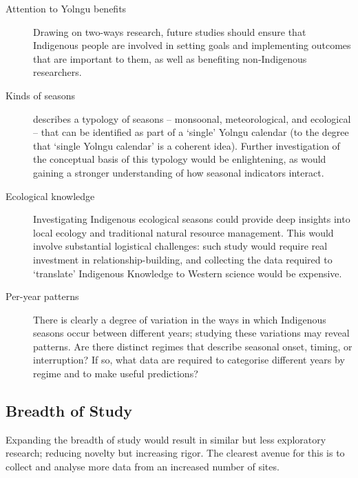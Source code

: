 \begin{description}
\item[Attention to Yolngu benefits]
    Drawing on two-ways research, future studies should ensure that Indigenous
    people are involved in setting goals and implementing outcomes that are
    important to them, as well as benefiting non-Indigenous researchers.

\item[Kinds of seasons]
     describes a typology of seasons -- monsoonal,
    meteorological, and ecological -- that can be identified as part of a
    `single' Yolngu calendar (to the degree that `single Yolngu calendar'
    is a coherent idea).  Further investigation of the conceptual basis of this typology would
    be enlightening, as would gaining a stronger understanding of how
    seasonal indicators interact.

\item[Ecological knowledge]
    Investigating Indigenous ecological seasons could provide deep insights
    into local ecology and traditional natural resource management. This would
    involve substantial logistical challenges:  such study would require real
    investment in relationship-building, and collecting the data
    required to `translate' Indigenous Knowledge to Western science would
    be expensive.

\item[Per-year patterns]
    There is clearly a degree of variation in the ways in which Indigenous seasons occur between
    different years; studying these variations may reveal patterns.  Are there distinct
    regimes that describe seasonal onset, timing, or interruption?  If so, what
    data are required to categorise different years by regime and to make useful predictions?
\end{description}

\subsection{Breadth of Study}
Expanding the breadth of study would result in similar but less exploratory
research; reducing novelty but increasing rigor.  The clearest avenue for
this is to collect and analyse more data from an increased number of sites.

